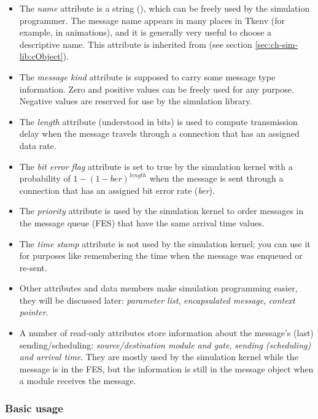 \begin{itemize}
  \item{The \textit{name} attribute is a string (),
    which can be freely used by the simulation programmer. The message
    name appears in many places in Tkenv (for example, in animations),
    and it is generally very useful to choose a descriptive name.
    This attribute is inherited from  (see section
    \ref{sec:ch-sim-lib:cObject}).}
  \item{The \textit{message kind} attribute is supposed to carry some message
    type information. Zero and positive values can be freely used
    for any purpose. Negative values are reserved for use by the
    {\opp} simulation library.}
  \item{The \textit{length} attribute (understood in bits) is used to compute
    transmission delay when the message travels through a connection
    that has an assigned data rate.}
  \item{The \textit{bit error flag} attribute is set to true by the simulation
    kernel with a probability of $1-(1-\textit{ber})^{\mathit{length}}$ when the
    message is sent through a connection that has an assigned bit
    error rate (\textit{ber}).}
  \item{The \textit{priority} attribute is used by the simulation kernel to
    order messages in the message queue (FES) that have the same
    arrival time values.}
  \item{The \textit{time stamp} attribute is not used by the simulation kernel;
    you can use it for purposes like remembering the time when the
    message was enqueued or re-sent.}
  \item{Other attributes and data members make simulation programming
    easier, they will be discussed later: \textit{parameter list}, \textit{encapsulated
      message}, \textit{context pointer}.}
  \item{A number of read-only attributes store information about the
    message's (last) sending/scheduling: \textit{source/destination module
      and gate}, \textit{sending (scheduling) and arrival time}. They are
    mostly used by the simulation kernel while the message is in
    the FES, but the information is still in the message object when
    a module receives the message.}
\end{itemize}


\subsubsection{Basic usage}


